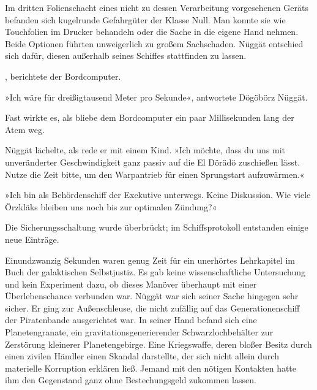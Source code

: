 Im dritten Folienschacht eines nicht zu dessen Verarbeitung vorgesehenen Geräts befanden sich kugelrunde Gefahrgüter der Klasse Null. Man konnte sie wie Touchfolien im Drucker behandeln oder die Sache in die eigene Hand nehmen. Beide Optionen führten unweigerlich zu großem Sachschaden. Nüggät entschied sich dafür, diesen außerhalb seines Schiffes stattfinden zu lassen.

, berichtete der Bordcomputer. 

»Ich wäre für dreißigtausend Meter pro Sekunde«, antwortete Dögöbörz Nüggät.

Fast wirkte es, als bliebe dem Bordcomputer ein paar Millisekunden lang der Atem weg. 

Nüggät lächelte, als rede er mit einem Kind. »Ich möchte, dass du uns mit unveränderter Geschwindigkeit ganz passiv auf die El Dörädö zuschießen lässt. Nutze die Zeit bitte, um den Warpantrieb für einen Sprungstart aufzuwärmen.«


»Ich bin als Behördenschiff der Exekutive unterwegs. Keine Diskussion. Wie viele Örzkläks bleiben uns noch bis zur optimalen Zündung?«

 Die Sicherungsschaltung wurde überbrückt; im Schiffsprotokoll entstanden einige neue Einträge. 

Einundzwanzig Sekunden waren genug Zeit für ein unerhörtes Lehrkapitel im Buch der galaktischen Selbstjustiz. Es gab keine wissenschaftliche Untersuchung und kein Experiment dazu, ob dieses Manöver überhaupt mit einer Überlebenschance verbunden war. Nüggät war sich seiner Sache hingegen sehr sicher. Er ging zur Außenschleuse, die nicht zufällig auf das Generationenschiff der Piratenbande ausgerichtet war. In seiner Hand befand sich eine Planetengranate, ein gravitationsgenerierender Schwarzlochbehälter zur Zerstörung kleinerer Planetengebirge. Eine Kriegswaffe, deren bloßer Besitz durch einen zivilen Händler einen Skandal darstellte, der sich nicht allein durch materielle Korruption erklären ließ. Jemand mit den nötigen Kontakten hatte ihm den Gegenstand ganz ohne Bestechungsgeld zukommen lassen.

